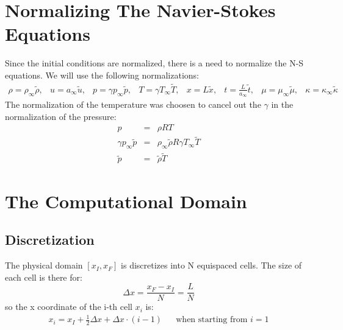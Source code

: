 \documentclass[11pt, a4paper]{article}
\begin{document}
\section{Normalizing The Navier-Stokes Equations}
Since the initial conditions are normalized, there is a need to normalize the N-S equations. We will use the following normalizations:
\begin{equation}
    \begin{matrix}
        \rho=\rho_\infty\tilde{\rho}, & u=a_\infty\tilde{u}, & p=\gamma p_\infty\tilde{p}, & T=\gamma T_\infty\tilde{T}, & x=L\tilde{x}, & t=\frac{L}{a_\infty}\tilde{t}, & \mu=\mu_\infty\tilde{\mu}, & \kappa=\kappa_\infty\tilde{\kappa}
    \end{matrix}
\end{equation}
The normalization of the temperature was choosen to cancel out the $\gamma$ in the normalization of the pressure:
\begin{equation}
    \begin{array}{lcl}
        p & = & \rho RT \\
        \gamma p_\infty\tilde{p} & = & \rho_\infty\tilde{\rho}R\gamma T_\infty\tilde{T} \\
        \tilde{p} & = & \tilde{\rho}\tilde{T}
    \end{array}
\end{equation}

\section{The Computational Domain}
\subsection{Discretization}
The physical domain $\left[x_I,x_F\right]$ is discretizes into N equispaced cells. The size of each cell is there for:
\begin{equation}
    \Delta x=\frac{x_F-x_I}{N}=\frac{L}{N}
\end{equation}
so the x coordinate of the i-th cell $x_i$ is:
\begin{equation}
    \begin{matrix}
        \displaystyle x_i=x_I+\frac{1}{2}\Delta x+\Delta x\cdot\left(i-1\right) && \text{when starting from $i=1$}
    \end{matrix}
\end{equation}
\end{document}
